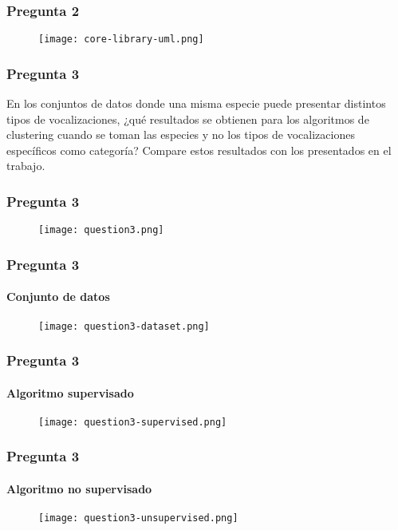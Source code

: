 \begin{frame}
    \frametitle{Pregunta 2}

    \begin{figure}[!h]
        \centering
        \texttt{[image: core-library-uml.png]}
    \end{figure}

\end{frame}

\begin{frame}
    \frametitle{Pregunta 3}

    En los conjuntos de datos donde una misma especie puede presentar distintos tipos de vocalizaciones, ¿qué resultados se obtienen para los algoritmos de clustering cuando se toman las especies y no los tipos de vocalizaciones específicos como categoría?
    Compare estos resultados con los presentados en el trabajo.

\end{frame}

\begin{frame}
    \frametitle{Pregunta 3}

    \begin{figure}[!h]
        \centering
        \texttt{[image: question3.png]}
    \end{figure}

\end{frame}

\begin{frame}
    \frametitle{Pregunta 3}
    \framesubtitle{Conjunto de datos}

    \begin{figure}[!h]
        \centering
        \texttt{[image: question3-dataset.png]}
    \end{figure}

\end{frame}

\begin{frame}
    \frametitle{Pregunta 3}
    \framesubtitle{Algoritmo supervisado}

    \begin{figure}[!h]
        \centering
        \texttt{[image: question3-supervised.png]}
    \end{figure}

\end{frame}

\begin{frame}
    \frametitle{Pregunta 3}
    \framesubtitle{Algoritmo no supervisado}

    \begin{figure}[!h]
        \centering
        \texttt{[image: question3-unsupervised.png]}
    \end{figure}

\end{frame}
